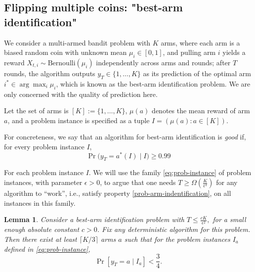 \documentclass[12pt]{article}
\newtheorem{lemma}[theorem]{Lemma}
\begin{document}
\subsection{Flipping multiple coins: "best-arm identification"}

\noindent We consider a multi-armed bandit problem with $K$ arms, where each arm is a biased random coin with unknown mean $\mu_i \in [0,1]$, and pulling arm $i$ yields a reward $X_{t,i} \sim \mathrm{Bernoulli}(\mu_i)$ independently across arms and rounds; after $T$ rounds, the algorithm outputs $y_T \in \{1,\dots,K\}$ as its prediction of the optimal arm $i^* \in \arg\max_{i} \mu_i$, which is known as the best-arm identification problem. We are only concerned with the quality of prediction here.

\vspace{5mm}

\noindent Let the set of arms is $[K] := \{1,\dots,K\}$, $\mu(a)$ denotes the mean reward of arm $a$, and a problem instance is specified as a tuple $I = (\mu(a) : a \in [K])$. 

\vspace{5mm}

\noindent For concreteness, we say that an algorithm for best-arm identification is \emph{good} if, for every problem instance $I$,
\begin{equation}
\Pr\!\big( y_T = a^*(I) \mid I \big) \ge 0.99
\label{prob-arm-indentification}
\tag{4.2}
\end{equation}

\noindent For each problem instance $I$. We will use the family \ref{eq:prob-instance} of problem instances, with parameter $\epsilon > 0$, to argue that one needs $T \ge \Omega\!\left(\frac{K}{\epsilon^2}\right)$ for any algorithm to ``work'', i.e., satisfy property 
\ref{prob-arm-indentification}, on all instances in this family.

\vspace{5mm}

\begin{lemma}
\label{lem:time-horizon-too-small}
Consider a best-arm identification problem with $T \le \frac{cK}{\epsilon^2},$
for a small enough absolute constant $c>0$. Fix any deterministic algorithm
for this problem. Then there exist at least $\lceil K/3 \rceil$ arms $a$
such that for the problem instances $I_a$ defined in \ref{eq:prob-instance},
\[
\Pr\!\left[ y_T = a \mid I_a \right] < \frac{3}{4}.
\]
\end{lemma} 
\end{document}
